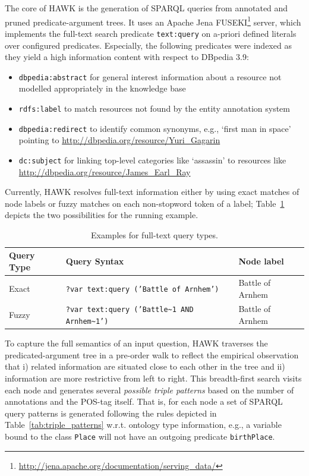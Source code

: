 The core of HAWK is the generation of SPARQL queries from annotated and pruned predicate-argument trees.
It uses an Apache Jena FUSEKI\footnote{\url{http://jena.apache.org/documentation/serving_data/}} server, which implements the full-text search predicate \texttt{text:query} on a-priori defined literals over configured predicates. %
Especially, the following predicates were indexed as they yield a high information content with respect to DBpedia 3.9:
\begin{itemize}
 \item \texttt{dbpedia:abstract} for general interest information about a resource not modelled appropriately in the knowledge base
 \item \texttt{rdfs:label} to match resources not found by the entity annotation system%
 \item \texttt{dbpedia:redirect} to identify common synonyms, e.g., `first man in space' pointing to \url{http://dbpedia.org/resource/Yuri_Gagarin}
 \item \texttt{dc:subject} for linking top-level categories like `assassin' to resources like \url{http://dbpedia.org/resource/James_Earl_Ray}
\end{itemize}
Currently, HAWK resolves full-text information either by using exact matches of node labels or fuzzy matches on each non-stopword token of a label; Table~\ref{tab:exact_fuzzy} depicts the two possibilities for the running example.

\begin{table}[htb!]
\centering
\caption{Examples for full-text query types.}
\begin{tabular}{l@{\quad}l@{\quad}l}
\toprule
\textbf{Query Type} & \textbf{Query Syntax} & \textbf{Node label}\\
\midrule
Exact & \texttt{?var text:query ('Battle of Arnhem')}  & Battle of Arnhem\\
Fuzzy & \texttt{?var text:query ('Battle\textasciitilde1 AND Arnhem\textasciitilde 1')} & Battle of Arnhem\\
\bottomrule
\end{tabular}
\label{tab:exact_fuzzy}
\end{table}
To capture the full semantics of an input question, HAWK traverses the predicated-argument tree in a pre-order walk to reflect the empirical observation that i) related information are situated close to each other in the tree and ii) information are more restrictive from left to right.
This breadth-first search visits each node and generates several \emph{possible triple patterns} based on the number of annotations and the POS-tag itself. 
That is, for each node a set of SPARQL query patterns is generated following the rules depicted in Table~\ref{tab:triple_patterns} w.r.t. ontology type information, e.g., a variable bound to the class \texttt{Place} will not have an outgoing predicate \texttt{birthPlace}.

